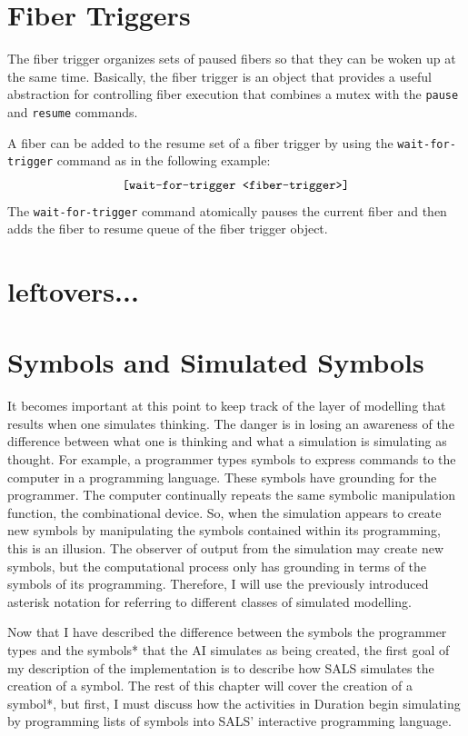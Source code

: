 \section{Fiber Triggers}

The fiber trigger organizes sets of paused fibers so that they can be
woken up at the same time.  Basically, the fiber trigger is an object
that provides a useful abstraction for controlling fiber execution
that combines a mutex with the {\tt pause} and {\tt resume} commands.

A fiber can be added to the resume set of a fiber trigger by using the
{\tt wait-for-trigger} command as in the following example:
\begin{equation*}
\text{\tt [wait-for-trigger <fiber-trigger>]}
\end{equation*}
The {\tt wait-for-trigger} command atomically pauses the current fiber
and then adds the fiber to resume queue of the fiber trigger object.

\section{leftovers...}

\section{Symbols and Simulated Symbols}

It becomes important at this point to keep track of the layer of
modelling that results when one simulates thinking.  The danger is in
losing an awareness of the difference between what one is thinking and
what a simulation is simulating as thought.  For example, a programmer
types symbols to express commands to the computer in a programming
language.  These symbols have grounding for the programmer.  The
computer continually repeats the same symbolic manipulation function,
the combinational device.  So, when the simulation appears to create
new symbols by manipulating the symbols contained within its
programming, this is an illusion.  The observer of output from the
simulation may create new symbols, but the computational process only
has grounding in terms of the symbols of its programming.  Therefore,
I will use the previously introduced asterisk notation for referring
to different classes of simulated modelling.

Now that I have described the difference between the symbols the
programmer types and the symbols* that the AI simulates as being
created, the first goal of my description of the implementation is to
describe how SALS simulates the creation of a symbol.  The rest of
this chapter will cover the creation of a symbol*, but first, I must
discuss how the activities in Duration begin simulating by programming
lists of symbols into SALS' interactive programming language.


